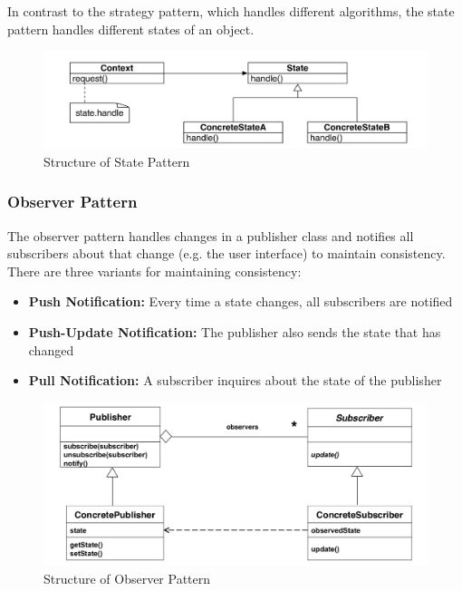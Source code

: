 In contrast to the strategy pattern, which handles different algorithms, the state pattern handles different states of an object.

\begin{figure}[h]
	\centering
	\includegraphics[width=\linewidth]{images/pattern_state.png}
	\caption{Structure of State Pattern}
\end{figure}
\newpage

\subsubsection{Observer Pattern}
The observer pattern handles changes in a publisher class and notifies all subscribers about that change (e.g. the user interface) to maintain consistency.
There are three variants for maintaining consistency:
\begin{itemize}
  \item \textbf{Push Notification:} Every time a state changes, all subscribers are notified
  \item \textbf{Push-Update Notification:} The publisher also sends the state that has changed
  \item \textbf{Pull Notification:} A subscriber inquires about the state of the publisher
\end{itemize}

\begin{figure}[h]
	\centering
	\includegraphics[width=\linewidth]{images/pattern_observer.png}
	\caption{Structure of Observer Pattern}
\end{figure}
\newpage

